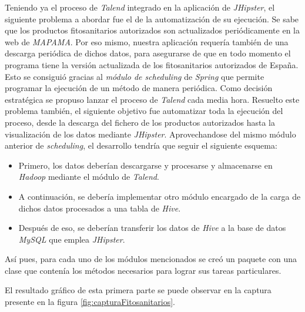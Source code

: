 \par
Teniendo ya el proceso de \textit{Talend} integrado en la aplicación de \textit{JHipster}, el siguiente problema a abordar fue el de la automatización de su ejecución. Se sabe que los productos fitosanitarios autorizados son actualizados periódicamente en la web de \textit{MAPAMA}. Por eso mismo, nuestra aplicación requería también de una descarga periódica de dichos datos, para asegurarse de que en todo momento el programa tiene la versión actualizada de los fitosanitarios autorizados de España. Esto se consiguió gracias al \textit{módulo de scheduling}\cite{spring_scheduling} de \textit{Spring} que permite programar la ejecución de un método de manera periódica. Como decisión estratégica se propuso lanzar el proceso de \textit{Talend} cada media hora. Resuelto este problema también, el siguiente objetivo fue automatizar toda la ejecución del proceso, desde la descarga del fichero de los productos autorizados hasta la visualización de los datos mediante \textit{JHipster}. Aprovechandose del mismo módulo anterior de \textit{scheduling}, el desarrollo tendría que seguir el siguiente esquema: 
\begin{itemize}
\item Primero, los datos deberían descargarse y procesarse y almacenarse en \textit{Hadoop} mediante el módulo de \textit{Talend}.
\item A continuación, se debería implementar otro módulo encargado de la carga de dichos datos procesados a una tabla de \textit{Hive}.
\item Después de eso, se deberían transferir los datos de \textit{Hive} a la base de datos \textit{MySQL} que emplea \textit{JHipster}.
\end{itemize}
  \par Así pues, para cada uno de los módulos mencionados se creó un paquete con una clase que contenía los métodos necesarios para lograr sus tareas particulares.
\par El resultado gráfico de esta primera parte se puede observar en la captura presente en la figura \ref{fig:capturaFitosanitarios}.



